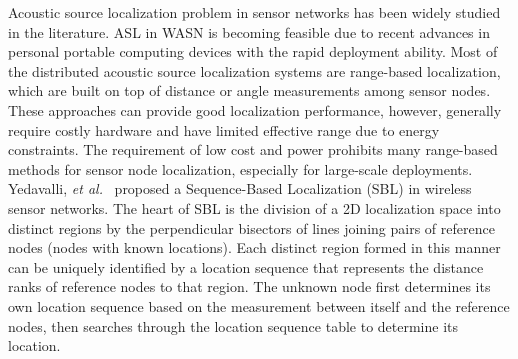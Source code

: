 Acoustic source localization problem in sensor networks has been widely studied in the literature. 
ASL in WASN is becoming feasible due to recent advances in personal portable computing devices with the rapid deployment ability.
Most of the distributed acoustic source localization systems are range-based localization, which are built on top of distance or angle measurements among sensor nodes. 
These approaches can provide good localization performance, however, generally require costly hardware and have limited effective range due to energy constraints. 
The requirement of low cost and power prohibits many range-based methods for sensor node localization, especially for large-scale deployments. 
Yedavalli, \emph{et al.}~\cite{yedavalli2008sequence} proposed a Sequence-Based Localization (SBL) in wireless sensor networks. The heart of SBL is the division of a 2D localization space into distinct regions by the perpendicular bisectors of lines joining pairs of reference nodes (nodes with known locations).
Each distinct region formed in this manner can be uniquely identified by a location sequence that represents the distance ranks of reference nodes to that region. 
The unknown node first determines its own location sequence based on the measurement between itself and the reference nodes, then searches through the location sequence table to determine its location.

